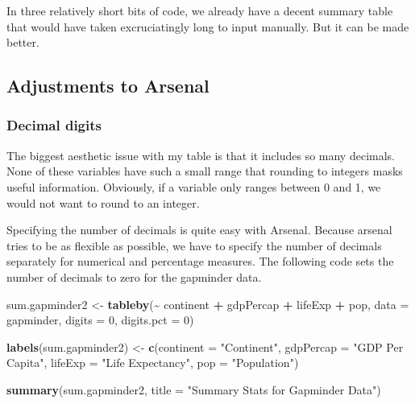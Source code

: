 \documentclass[
]{book}
\makeatletter
\newenvironment{Shaded}{\begin{snugshade}}{\end{snugshade}}
\newcommand{\AttributeTok}[1]{\textcolor[rgb]{0.27,0.27,0.27}{#1}}
\newcommand{\DecValTok}[1]{\textcolor[rgb]{0.06,0.06,0.06}{#1}}
\newcommand{\FunctionTok}[1]{\textcolor[rgb]{0.27,0.27,0.27}{\textbf{#1}}}
\newcommand{\NormalTok}[1]{#1}
\newcommand{\OtherTok}[1]{\textcolor[rgb]{0.37,0.37,0.37}{#1}}
\newcommand{\SpecialCharTok}[1]{\textcolor[rgb]{0.43,0.43,0.43}{\textbf{#1}}}
\newcommand{\StringTok}[1]{\textcolor[rgb]{0.5,0.5,0.5}{#1}}
\newenvironment{kframe}{%
\medskip{}
\setlength{\fboxsep}{.8em}
 \def\at@end@of@kframe{}%
 \ifinner\ifhmode%
  \def\at@end@of@kframe{\end{minipage}}%
  \begin{minipage}{\columnwidth}%
 \fi\fi%
 \def\FrameCommand##1{\hskip\@totalleftmargin \hskip-\fboxsep
 \colorbox{shadecolor}{##1}\hskip-\fboxsep
     \hskip-\linewidth \hskip-\@totalleftmargin \hskip\columnwidth}%
 \MakeFramed {\advance\hsize-\width
   \@totalleftmargin\z@ \linewidth\hsize
   \@setminipage}}%
 {\par\unskip\endMakeFramed%
 \at@end@of@kframe}
\renewenvironment{Shaded}{\begin{kframe}}{\end{kframe}}
\makeatother
\begin{document}
In three relatively short bits of code, we already have a decent summary table that would have taken excruciatingly long to input manually. But it can be made better.

\hypertarget{adjustments-to-arsenal}{%
\subsection{Adjustments to Arsenal}\label{adjustments-to-arsenal}}

\hypertarget{decimal-digits}{%
\subsubsection{Decimal digits}\label{decimal-digits}}

The biggest aesthetic issue with my table is that it includes so many decimals. None of these variables have such a small range that rounding to integers masks useful information. Obviously, if a variable only ranges between 0 and 1, we would not want to round to an integer.

Specifying the number of decimals is quite easy with Arsenal. Because arsenal tries to be as flexible as possible, we have to specify the number of decimals separately for numerical and percentage measures. The following code sets the number of decimals to zero for the gapminder data.

\begin{Shaded}
\begin{Highlighting}[]
\NormalTok{sum.gapminder2 }\OtherTok{\textless{}{-}} \FunctionTok{tableby}\NormalTok{(}\SpecialCharTok{\textasciitilde{}}\NormalTok{ continent }\SpecialCharTok{+}\NormalTok{ gdpPercap }\SpecialCharTok{+}\NormalTok{ lifeExp }\SpecialCharTok{+}\NormalTok{ pop, }\AttributeTok{data =}\NormalTok{ gapminder, }\AttributeTok{digits =} \DecValTok{0}\NormalTok{, }\AttributeTok{digits.pct =} \DecValTok{0}\NormalTok{)}

\FunctionTok{labels}\NormalTok{(sum.gapminder2) }\OtherTok{\textless{}{-}} \FunctionTok{c}\NormalTok{(}\AttributeTok{continent =} \StringTok{"Continent"}\NormalTok{, }\AttributeTok{gdpPercap =} \StringTok{"GDP Per Capita"}\NormalTok{, }\AttributeTok{lifeExp =} \StringTok{"Life Expectancy"}\NormalTok{, }\AttributeTok{pop =} \StringTok{"Population"}\NormalTok{)}
\end{Highlighting}
\end{Shaded}

\begin{Shaded}
\begin{Highlighting}[]
\FunctionTok{summary}\NormalTok{(sum.gapminder2, }\AttributeTok{title =} \StringTok{"Summary Stats for Gapminder Data"}\NormalTok{)}
\end{Highlighting}
\end{Shaded}
\end{document}
